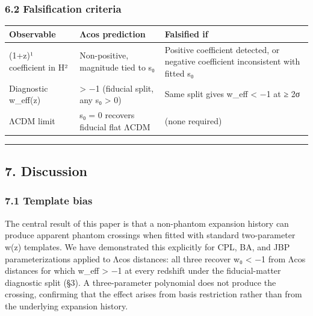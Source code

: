 \subsubsection{6.2 Falsification criteria}\label{falsification-criteria}

{\def\LTcaptype{none} %
\begin{longtable}[]{@{}
  >{\raggedright\arraybackslash}p{}
  >{\raggedright\arraybackslash}p{}
  >{\raggedright\arraybackslash}p{}@{}}
\toprule\noalign{}
\begin{minipage}[b]{\linewidth}\raggedright
Observable
\end{minipage} & \begin{minipage}[b]{\linewidth}\raggedright
Λcos prediction
\end{minipage} & \begin{minipage}[b]{\linewidth}\raggedright
Falsified if
\end{minipage} \\
\midrule\noalign{}
\endhead
\bottomrule\noalign{}
\endlastfoot
(1+z)¹ coefficient in H² & Non-positive, magnitude tied to s₀ & Positive
coefficient detected, or negative coefficient inconsistent with fitted
s₀ \\
Diagnostic w\_eff(z) & \textgreater{} −1 (fiducial split, any s₀
\textgreater{} 0) & Same split gives w\_eff \textless{} −1 at ≥ 2σ \\
ΛCDM limit & s₀ = 0 recovers fiducial flat ΛCDM & (none required) \\
\end{longtable}
}

\begin{center}\rule{0.5\linewidth}{0.5pt}\end{center}

\subsection{7. Discussion}\label{discussion}

\subsubsection{7.1 Template bias}\label{template-bias}

The central result of this paper is that a non-phantom expansion history
can produce apparent phantom crossings when fitted with standard
two-parameter w(z) templates. We have demonstrated this explicitly for
CPL, BA, and JBP parameterizations applied to Λcos distances: all three
recover w₀ \textless{} −1 from Λcos distances for which w\_eff
\textgreater{} −1 at every redshift under the fiducial-matter diagnostic
split (§3). A three-parameter polynomial does not produce the crossing,
confirming that the effect arises from basis restriction rather than
from the underlying expansion history.

